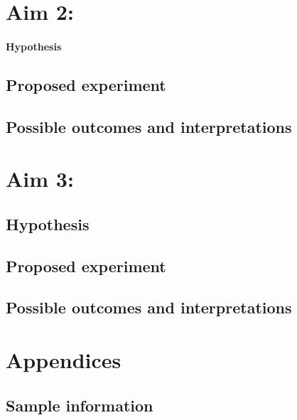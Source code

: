 \documentclass[12pt]{article}
\begin{document}
	\section{Aim 2:}
	
		\paragraph{Hypothesis}
		
		\subsection{Proposed experiment}
		
		\subsection{Possible outcomes and interpretations}		
		
	\section{Aim 3:}
	
		\subsection{Hypothesis}
		
		\subsection{Proposed experiment}
		
		\subsection{Possible outcomes and interpretations}				
	

\appendix
	\section{Appendices}
		
		\subsection{Sample information}
\end{document}

